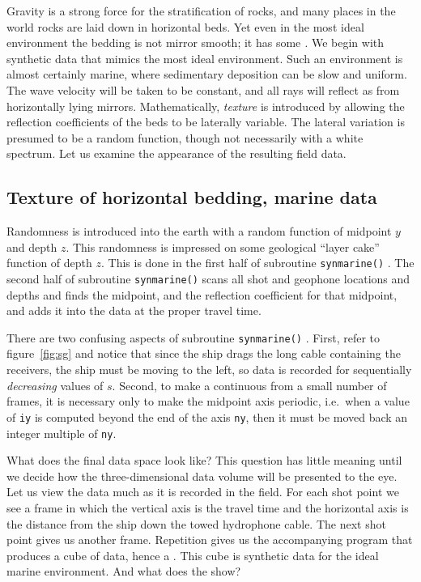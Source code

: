 \par
Gravity is a strong force for the stratification of rocks,
and many places in the world rocks are laid down
in horizontal beds.
Yet even in the most ideal environment the bedding is
not mirror smooth; it has some
{\em {}.}
We begin with synthetic data that mimics the most ideal environment.
Such an environment is almost certainly marine,
where sedimentary deposition can be slow and uniform.
The wave velocity will be taken to be constant,
and all rays will reflect as from horizontally lying mirrors.
Mathematically,
{\em texture}
is introduced by allowing the reflection coefficients
of the beds to be laterally variable.
The lateral variation is presumed to be a random function,
though not necessarily with a white spectrum.
Let us examine the appearance of the resulting field data.

\subsection{Texture of horizontal bedding, marine data}
Randomness is introduced into the earth with
a random function of midpoint  $y$  and depth  $z$.
This randomness is impressed on
some geological ``layer cake'' function of depth $z$.
This is done in the first half of subroutine \texttt{synmarine()} . %
The second half of subroutine \texttt{synmarine()} 
scans all shot and geophone locations and depths
and finds the midpoint,
and the reflection coefficient for that midpoint,
and adds it into the data at the proper travel time.

\par
There are two confusing aspects of subroutine \texttt{synmarine()} .
First, refer to figure~\ref{fig:sg} and notice that since the ship
drags the long cable containing the receivers,
the ship must be moving to the left, so data is recorded
for sequentially {\em decreasing} values of $s$.
Second, to make a continuous 
from a small number of frames,
it is necessary only to make the midpoint axis periodic,
i.e.~when a value of {\tt iy} is computed beyond the end of the axis
{\tt ny}, then it must be moved back an integer multiple of {\tt ny}.

\par
What does the final data space look like?
This question has little meaning until we decide how the three-dimensional
data volume will be presented to the eye.
Let us view the data much as it is recorded in the field.
For each shot point we see a frame 
in which the vertical axis is the travel time
and the horizontal axis is the distance from the ship down the towed
hydrophone cable.
The next shot point gives us another frame.
Repetition gives us the accompanying program
that produces a cube of data, hence a .
This cube is synthetic data for the ideal marine environment.
And what does the  show?

